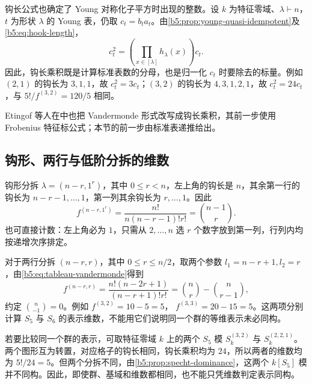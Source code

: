 钩长公式也确定了 Young 对称化子平方时出现的整数。设 \(k\) 为特征零域、\(\lambda\vdash n\)，\(t\) 为形状 \(\lambda\) 的 Young 表，仍取 \(c_t=b_ta_t\)。由\cref{b5:prop:young-quasi-idempotent}及\eqref{b5:eq:hook-length}，
\begin{equation}\label{b5:eq:young-hook-product}
	c_t^2=\left(\prod_{x\in[\lambda]}h_\lambda(x)\right)c_t.
\end{equation}
因此，钩长乘积既是计算标准表数的分母，也是归一化 \(c_t\) 时要除去的标量。例如 \((2,1)\) 的钩长为 \(3,1,1\)，故 \(c_t^2=3c_t\)；\((3,2)\) 的钩长为 \(4,3,1,2,1\)，故 \(c_t^2=24c_t\)，与 \(5!/f^{(3,2)}=120/5\) 相同。

\ProseParagraphBreak

Etingof 等人在\cite[Section 5.17, pp. 118--119]{EtingofEtAl2011RepresentationTheory}中也把 Vandermonde 形式改写成钩长乘积，其前一步使用 Frobenius 特征标公式；本节的前一步由标准表递推给出。

\subsection{钩形、两行与低阶分拆的维数}
\label{b5:subsec:0605:03}

钩形分拆 \(\lambda=(n-r,1^r)\)，其中 \(0\leq r<n\)，左上角的钩长是 \(n\)，其余第一行的钩长为 \(n-r-1,\ldots,1\)，第一列其余钩长为 \(r,\ldots,1\)。因此
\begin{equation}\label{b5:eq:hook-shape-dimension}
	f^{(n-r,1^r)} =\frac{n!}{n(n-r-1)!r!} =\binom{n-1}{r}.
\end{equation}
也可直接计数：左上角必为 \(1\)，只需从 \(2,\ldots,n\) 选 \(r\) 个数字放到第一列，行列内均按递增次序排定。

\ProseParagraphBreak

对于两行分拆 \((n-r,r)\)，其中 \(0\leq r\leq n/2\)，取两个参数 \(l_1=n-r+1,l_2=r\)，由\eqref{b5:eq:tableau-vandermonde}得到
\begin{equation}\label{b5:eq:two-row-dimension}
	f^{(n-r,r)} =\frac{n!(n-2r+1)}{(n-r+1)!r!} =\binom nr-\binom n{r-1},
\end{equation}
约定 \(\binom n{-1}=0\)。例如 \(f^{(3,2)}=10-5=5\)， \(f^{(3,3)}=20-15=5\)。这两项分别计算 \(S_5\) 与 \(S_6\) 的表示维数，不能用它们说明同一个群的等维表示未必同构。

若要比较同一个群的表示，可取特征零域 \(k\) 上的两个 \(S_5\) 模 \(S_k^{(3,2)}\) 与 \(S_k^{(2,2,1)}\)。两个图形互为转置，对应格子的钩长相同，钩长乘积均为 \(24\)，所以两者的维数均为 \(5!/24=5\)。但两个分拆不同，由\cref{b5:prop:specht-dominance}，这两个 \(k[S_5]\) 模并不同构。因此，即使群、基域和维数都相同，也不能只凭维数判定表示同构。

